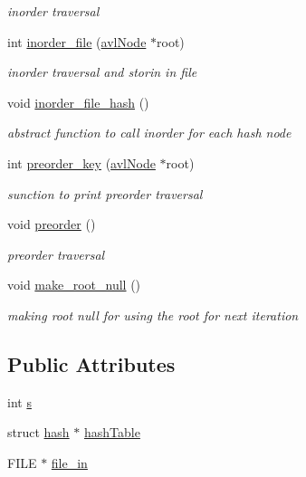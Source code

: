 \begin{DoxyCompactItemize}
\begin{DoxyCompactList}\small\item\em inorder traversal \end{DoxyCompactList}\item 
int \hyperlink{class_a_v_lhash_1_1avl_tree_a877399f773eaf8a92bf0ec26e010bea2}{inorder\-\_\-file} (\hyperlink{namespace_a_v_lhash_a09cd9142193c004fe02c59c9dbc29732}{avl\-Node} $\ast$root)
\begin{DoxyCompactList}\small\item\em inorder traversal and storin in file \end{DoxyCompactList}\item 
void \hyperlink{class_a_v_lhash_1_1avl_tree_adb01a9521893b33956dd0c8df335a338}{inorder\-\_\-file\-\_\-hash} ()
\begin{DoxyCompactList}\small\item\em abstract function to call inorder for each hash node \end{DoxyCompactList}\item 
int \hyperlink{class_a_v_lhash_1_1avl_tree_aa08aa6743d88ba4653df3786077fc21e}{preorder\-\_\-key} (\hyperlink{namespace_a_v_lhash_a09cd9142193c004fe02c59c9dbc29732}{avl\-Node} $\ast$root)
\begin{DoxyCompactList}\small\item\em sunction to print preorder traversal \end{DoxyCompactList}\item 
void \hyperlink{class_a_v_lhash_1_1avl_tree_a27c2765693634056541b66d4e521485c}{preorder} ()
\begin{DoxyCompactList}\small\item\em preorder traversal \end{DoxyCompactList}\item 
void \hyperlink{class_a_v_lhash_1_1avl_tree_a7e04c5815725c08178cf6d22f1f37d2a}{make\-\_\-root\-\_\-null} ()
\begin{DoxyCompactList}\small\item\em making root null for using the root for next iteration \end{DoxyCompactList}\end{DoxyCompactItemize}
\subsection*{Public Attributes}
\begin{DoxyCompactItemize}
\item 
int \hyperlink{class_a_v_lhash_1_1avl_tree_a98e40b4ee8d489d79db9e2a691bfedbb}{s}
\item 
struct \hyperlink{struct_a_v_lhash_1_1avl_tree_1_1hash}{hash} $\ast$ \hyperlink{class_a_v_lhash_1_1avl_tree_afceac1339c2bd32b781eb2b5fc85d8c6}{hash\-Table}
\item 
F\-I\-L\-E $\ast$ \hyperlink{class_a_v_lhash_1_1avl_tree_af03941d80a5faf3c44d27ce25a5282e9}{file\-\_\-in}
\end{DoxyCompactItemize}



